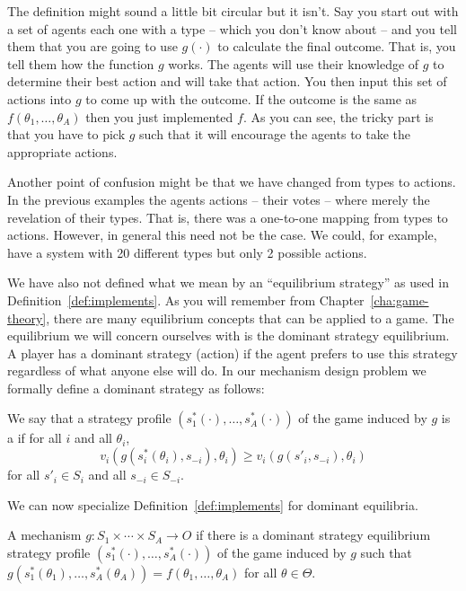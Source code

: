 The definition might sound a little bit circular but it isn't. Say you
start out with a set of agents each one with a type -- which you don't
know about -- and you tell them that you are going to use $g(\cdot)$
to calculate the final outcome. That is, you tell them how the
function $g$ works. The agents will use their knowledge of $g$ to
determine their best action and will take that action. You then input
this set of actions into $g$ to come up with the outcome. If the
outcome is the same as $f(\theta_1,\ldots , \theta_A)$ then you just
implemented $f$.  As you can see, the tricky part is that you have to
pick $g$ such that it will encourage the agents to take the
appropriate actions.

Another point of confusion might be that we have changed from types to
actions. In the previous examples the agents actions -- their votes --
where merely the revelation of their types. That is, there was a
one-to-one mapping from types to actions. However, in general this
need not be the case. We could, for example, have a system with 20
different types but only 2 possible actions.

We have also not defined what we mean by an ``equilibrium strategy''
as used in Definition~\ref{def:implements}. As you will remember from
Chapter~\ref{cha:game-theory}, there are many equilibrium concepts
that can be applied to a game. The equilibrium we will concern
ourselves with is the dominant strategy equilibrium. A player
has a dominant strategy (action) if the agent prefers to use this
strategy regardless of what anyone else will do.  In our mechanism
design problem we formally define a dominant strategy as follows:


\begin{definition}
  \label{def:dominant}
  We say that a strategy profile $(s_1^*(\cdot),\ldots ,s_A^*(\cdot))$
  of the game induced by $g$ is a 
  if for all $i$ and all $\theta_i$,
  \[v_i(g(s_i^*(\theta_i),s_{-i}), \theta_i) \geq  v_i(g(s'_i,s_{-i}),\theta_i) \]
  for all $s'_i \in S_i$ and all $s_{-i}\in S_{-i}$.
\end{definition}

We can now specialize Definition~\ref{def:implements} for dominant
equilibria.

\begin{definition}
  \label{def:implementsd}
  A mechanism $g: S_1 \times \cdots \times S_A \rightarrow O$
   if there is a dominant strategy equilibrium strategy
  profile $(s_1^*(\cdot),\ldots ,s_A^*(\cdot))$ of the game induced
  by $g$ such that $g(s_1^*(\theta_1),\ldots ,s_A^*(\theta_A)) =
  f(\theta_1,\ldots , \theta_A)$ for all $\theta \in \Theta$.
\end{definition}

